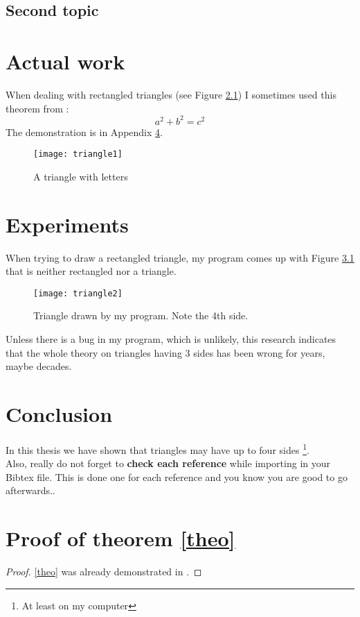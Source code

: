 \documentclass{thesisreport}
\begin{document}
 \section{Second topic}
 
 \chapter{Actual work}
  
 
 When dealing with rectangled triangles (see Figure \ref{triangle}) I sometimes used this theorem from \cite{pythm001}:
 \begin{equation}\label{theo}
  a^2 + b^2 = c^2
 \end{equation}The demonstration is in Appendix \ref{sec:prooftheorem}.
 
 \begin{figure}[h]\centering
  \texttt{[image: triangle1]}
  \caption{A triangle with letters} \label{triangle}
 \end{figure}
 
 


 
 
 \chapter{Experiments}
 
 When trying to draw a rectangled triangle, my program comes up with Figure \ref{triangle2} that is neither rectangled nor a triangle.
 
  \begin{figure}[h]\centering
  \texttt{[image: triangle2]}
  \caption{Triangle drawn by my program. Note the 4th side.} \label{triangle2}
 \end{figure}
 
Unless there is a bug in my program, which is unlikely, this research indicates that the whole theory on triangles having 3 sides has been wrong for years, maybe decades.
 
 
 \chapter*{Conclusion}
 
 
In this thesis we have shown that triangles may have up to four sides \footnote{At least on my computer}.\\


  Also, really do not forget to {\bf check each reference} while importing in your Bibtex file. This is done one for each reference and you know you are good to go afterwards..
 
 
 \appendix	
 
 \chapter{Proof of theorem \ref{theo}}
 \label{sec:prooftheorem}
 
 
 \begin{proof}
\eqref{theo} was already demonstrated in \cite{euclides300}.
\end{proof}
 
 
 
 
 
 
 
\end{document}
